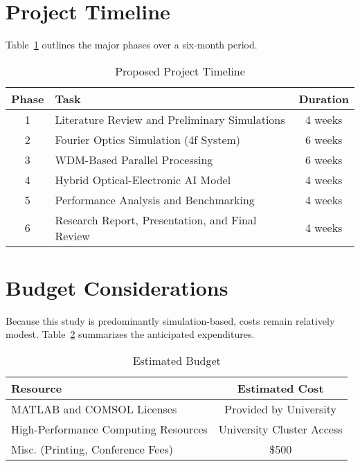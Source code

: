 \documentclass[conference]{IEEEtran}
\begin{document}
\section{Project Timeline}
Table~\ref{timeline} outlines the major phases over a six-month period.

\begin{table}[h]
\centering
\caption{Proposed Project Timeline}
\label{timeline}
\begin{tabular}{|c|p{5.5cm}|c|}
\hline
\textbf{Phase} & \textbf{Task} & \textbf{Duration} \\
\hline
1 & Literature Review and Preliminary Simulations & 4 weeks \\
2 & Fourier Optics Simulation (4f System) & 6 weeks \\
3 & WDM-Based Parallel Processing & 6 weeks \\
4 & Hybrid Optical-Electronic AI Model & 4 weeks \\
5 & Performance Analysis and Benchmarking & 4 weeks \\
6 & Research Report, Presentation, and Final Review & 4 weeks \\
\hline
\end{tabular}
\end{table}

\section{Budget Considerations}
Because this study is predominantly simulation-based, costs remain relatively modest. Table~\ref{budget} summarizes the anticipated expenditures.

\begin{table}[h]
\centering
\caption{Estimated Budget}
\label{budget}
\begin{tabular}{|l|c|}
\hline
\textbf{Resource} & \textbf{Estimated Cost} \\
\hline
MATLAB and COMSOL Licenses & Provided by University \\
High-Performance Computing Resources & University Cluster Access \\
Misc. (Printing, Conference Fees) & \$500 \\
\hline
\end{tabular}
\end{table}
\end{document}
